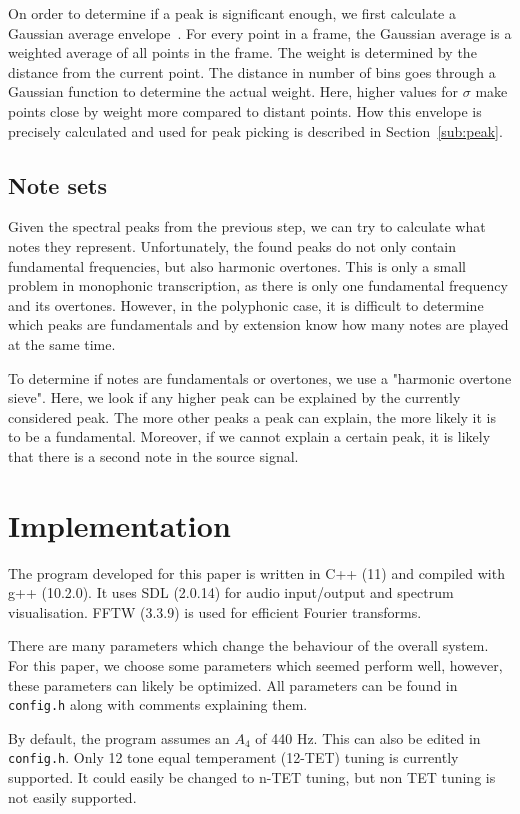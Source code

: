 \documentclass[10pt,twocolumn]{article}
\begin{document}
On order to determine if a peak is significant enough, we first calculate a Gaussian average envelope~\cite{gauss}. For every point in a frame, the Gaussian average is a weighted average of all points in the frame. The weight is determined by the distance from the current point. The distance in number of bins goes through a Gaussian function to determine the actual weight. Here, higher values for $\sigma$ make points close by weight more compared to distant points. How this envelope is precisely calculated and used for peak picking is described in Section~\ref{sub:peak}.

\subsection{Note sets}
Given the spectral peaks from the previous step, we can try to calculate what notes they represent. Unfortunately, the found peaks do not only contain fundamental frequencies, but also harmonic overtones. This is only a small problem in monophonic transcription, as there is only one fundamental frequency and its overtones. However, in the polyphonic case, it is difficult to determine which peaks are fundamentals and by extension know how many notes are played at the same time.

To determine if notes are fundamentals or overtones, we use a "harmonic overtone sieve". Here, we look if any higher peak can be explained by the currently considered peak. The more other peaks a peak can explain, the more likely it is to be a fundamental. Moreover, if we cannot explain a certain peak, it is likely that there is a second note in the source signal.


\section{Implementation}  \label{sec:impl}
The program developed for this paper is written in C++ (11) and compiled with g++ (10.2.0). It uses SDL (2.0.14) for audio input/output and spectrum visualisation. FFTW (3.3.9) is used for efficient Fourier transforms.

There are many parameters which change the behaviour of the overall system. For this paper, we choose some parameters which seemed perform well, however, these parameters can likely be optimized. All parameters can be found in \texttt{config.h} along with comments explaining them.

By default, the program assumes an $A_4$ of 440 Hz. This can also be edited in \texttt{config.h}. Only 12 tone equal temperament (12-TET) tuning is currently supported. It could easily be changed to n-TET tuning, but non TET tuning is not easily supported.
\end{document}
